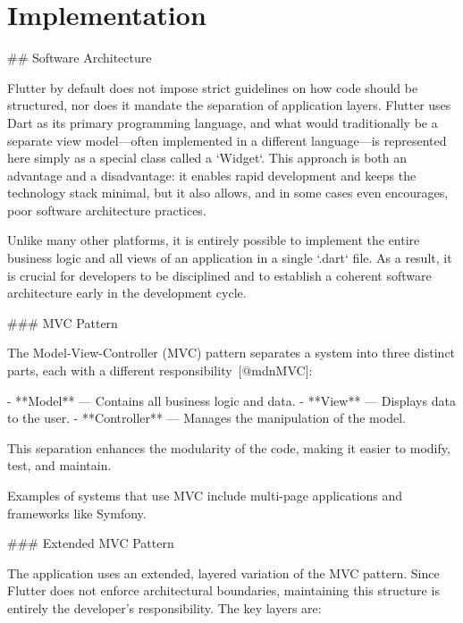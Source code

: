 \documentclass[
  digital,     %
  oneside,     %
  nosansbold,  %
  nocolorbold, %
  lof,         %
  lot,         %
]{fithesis4}
\begin{document}
\shorthandoff{-}
\begin{markdown}
\end{markdown}
\shorthandon{-}

\chapter{Implementation}
\shorthandoff{-}
\begin{markdown}

## Software Architecture

Flutter by default does not impose strict guidelines on how code should be structured, nor does it mandate the separation of application layers. Flutter uses Dart as its primary programming language, and what would traditionally be a separate view model—often implemented in a different language—is represented here simply as a special class called a `Widget`. This approach is both an advantage and a disadvantage: it enables rapid development and keeps the technology stack minimal, but it also allows, and in some cases even encourages, poor software architecture practices.

Unlike many other platforms, it is entirely possible to implement the entire business logic and all views of an application in a single `.dart` file. As a result, it is crucial for developers to be disciplined and to establish a coherent software architecture early in the development cycle.

### MVC Pattern

The Model-View-Controller (MVC) pattern separates a system into three distinct parts, each with a different responsibility~[@mdnMVC]:

- **Model** — Contains all business logic and data.
- **View** — Displays data to the user.
- **Controller** — Manages the manipulation of the model.

This separation enhances the modularity of the code, making it easier to modify, test, and maintain.

Examples of systems that use MVC include multi-page applications and frameworks like Symfony.

### Extended MVC Pattern

The application uses an extended, layered variation of the MVC pattern. Since Flutter does not enforce architectural boundaries, maintaining this structure is entirely the developer's responsibility. The key layers are:


\end{markdown}
\end{document}
